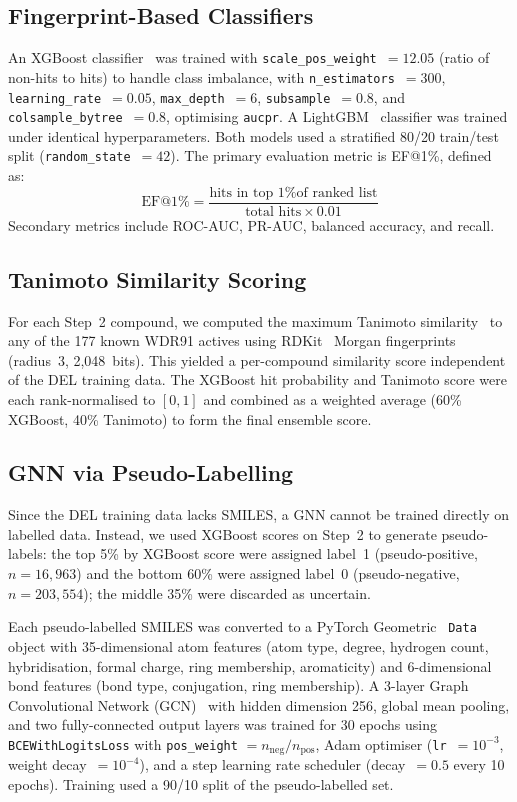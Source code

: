 \documentclass[10pt, letterpaper]{article}
\begin{document}
\subsection{Fingerprint-Based Classifiers}
An XGBoost classifier~\cite{Chen2016} was trained with \texttt{scale\_pos\_weight}~$= 12.05$ (ratio of non-hits to hits) to handle class imbalance, with \texttt{n\_estimators}~$= 300$, \texttt{learning\_rate}~$= 0.05$, \texttt{max\_depth}~$= 6$, \texttt{subsample}~$= 0.8$, and \texttt{colsample\_bytree}~$= 0.8$, optimising \texttt{aucpr}. A LightGBM~\cite{Ke2017} classifier was trained under identical hyperparameters. Both models used a stratified 80/20 train/test split (\texttt{random\_state}~$= 42$). The primary evaluation metric is EF@1\%, defined as:
\begin{equation}
\text{EF@1\%} = \frac{\text{hits in top 1\% of ranked list}}{\text{total hits} \times 0.01}
\end{equation}
Secondary metrics include ROC-AUC, PR-AUC, balanced accuracy, and recall.

\subsection{Tanimoto Similarity Scoring}
For each Step~2 compound, we computed the maximum Tanimoto similarity~\cite{Tanimoto1958} to any of the 177 known WDR91 actives using RDKit~\cite{RDKit} Morgan fingerprints (radius~3, 2,048~bits). This yielded a per-compound similarity score independent of the DEL training data. The XGBoost hit probability and Tanimoto score were each rank-normalised to $[0,1]$ and combined as a weighted average (60\% XGBoost, 40\% Tanimoto) to form the final ensemble score.

\subsection{GNN via Pseudo-Labelling}
Since the DEL training data lacks SMILES, a GNN cannot be trained directly on labelled data. Instead, we used XGBoost scores on Step~2 to generate pseudo-labels: the top 5\% by XGBoost score were assigned label~1 (pseudo-positive, $n = 16{,}963$) and the bottom 60\% were assigned label~0 (pseudo-negative, $n = 203{,}554$); the middle 35\% were discarded as uncertain.

Each pseudo-labelled SMILES was converted to a PyTorch Geometric~\cite{Fey2019} \texttt{Data} object with 35-dimensional atom features (atom type, degree, hydrogen count, hybridisation, formal charge, ring membership, aromaticity) and 6-dimensional bond features (bond type, conjugation, ring membership). A 3-layer Graph Convolutional Network (GCN)~\cite{Kipf2017} with hidden dimension 256, global mean pooling, and two fully-connected output layers was trained for 30 epochs using \texttt{BCEWithLogitsLoss} with \texttt{pos\_weight} $= n_{\text{neg}} / n_{\text{pos}}$, Adam optimiser (\texttt{lr}~$= 10^{-3}$, weight decay~$= 10^{-4}$), and a step learning rate scheduler (decay~$= 0.5$ every 10 epochs). Training used a 90/10 split of the pseudo-labelled set.
\end{document}
